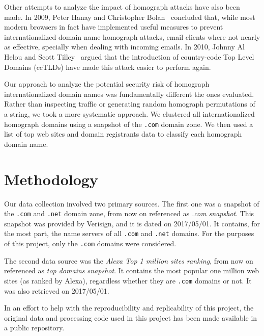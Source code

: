 \documentclass[letterpaper,twocolumn,10pt]{article}
\begin{document}
Other attempts to analyze the impact of homograph attacks have also been made.
In 2009, Peter Hanay and Christopher Bolan~\cite{hannay2009} concluded that, while most modern browsers in fact have implemented useful measures to prevent internationalized domain name homograph attacks, email clients where not nearly as effective, specially when dealing with incoming emails.
In 2010, Johnny Al Helou and Scott Tilley~\cite{al2010} argued that the introduction of country-code Top Level Domains (ccTLDs) have made this attack easier to perform again.

Our approach to analyze the potential security risk of homograph internationalized domain names was fundamentally different the ones evaluated.
Rather than inspecting traffic or generating random homograph permutations of a string, we took a more systematic approach.
We clustered all internationalized homograph domains using a snapshot of the \texttt{.com} domain zone.
We then used a list of top web sites and domain registrants data to classify each homograph domain name.

\section{Methodology}
Our data collection involved two primary sources.
The first one was a snapshot of the \texttt{.com} and \texttt{.net} domain zone, from now on referenced as \textit{.com snapshot}.
This snapshot was provided by Verisign, and it is dated on 2017/05/01.
It contains, for the most part, the name servers of all \texttt{.com} and \texttt{.net} domains.
For the purposes of this project, only the \texttt{.com} domains were considered.

The second data source was the \textit{Alexa Top 1 million sites ranking}, from now on referenced as \textit{top domains snapshot}.
It contains the most popular one million web sites (as ranked by Alexa), regardless whether they are \texttt{.com} domains or not.
It was also retrieved on 2017/05/01.

In an effort to help with the reproducibility and replicability of this project, the original data and processing code used in this project has been made available in a public repository.
\end{document}
